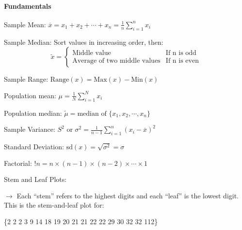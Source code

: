 \documentclass[10pt, letterpaper]{paper}
\begin{document}

    \begin{multicols*}{2}
        \paragraph*{Fundamentals}\mbox{}

        Sample Mean: $\overline{x} = x_1 + x_2 + \cdots + x_n = \frac{1}{n}\sum\limits_{i=1}^{n}x_i$
        
        Sample Median: Sort values in increasing order, then: 
        $$
            \tilde{x} = 
            \left\{
                \begin{array}{ll}
                    \text{Middle value}                 & \text{If n is odd}    \\
                    \text{Average of two middle values} & \text{If n is even}
                \end{array}
            \right.
        $$

        Sample Range: $\text{Range}(x) = \text{Max}(x) - \text{Min}(x)$

        Population mean: $\mu = \frac{1}{N}\sum\limits_{i=1}^{N}x_i$
        
        Population median: $\tilde{\mu} = \text{median of } \{x_1, x_2, \cdots, x_n\}$

        Sample Variance: $S^2 \text{ or } \sigma^{2} = \frac{1}{n-1}\sum\limits_{i=1}^{n}(x_i-\overline{x})^2$

        Standard Deviation: $\text{sd}(x) = \sqrt{\sigma^2} = \sigma$

        Factorial: $!n = n \times (n-1) \times (n-2) \times \cdots \times 1$

        Stem and Leaf Plots:

        $\rightarrow$ Each ``stem'' refers to the highest digits and each ``leaf'' is the lowest digit. This is the stem-and-leaf plot for: 

        \begin{center}
            \{2 2 2 3 9 14 18 19 20 21 21 22 22 29 30 32 32 112\}
        

\end{center}
\end{multicols*}
\end{document}
